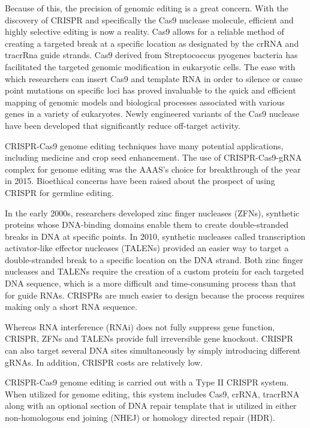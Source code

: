 Because of this, the precision of genomic editing is a great concern. With the discovery of CRISPR and specifically the Cas9 nuclease molecule, efficient and highly selective editing is now a reality. Cas9 allows for a reliable method of creating a targeted break at a specific location as designated by the crRNA and tracrRna guide strands. Cas9 derived from Streptococcus pyogenes bacteria has facilitated the targeted genomic modification in eukaryotic cells. The ease with which researchers can insert Cas9 and template RNA in order to silence or cause point mutations on specific loci has proved invaluable to the quick and efficient mapping of genomic models and biological processes associated with various genes in a variety of eukaryotes. Newly engineered variants of the Cas9 nuclease have been developed that significantly reduce off-target activity.

CRISPR-Cas9 genome editing techniques have many potential applications, including medicine and crop seed enhancement. The use of CRISPR-Cas9-gRNA complex for genome editing was the AAAS's choice for breakthrough of the year in 2015. Bioethical concerns have been raised about the prospect of using CRISPR for germline editing.

In the early 2000s, researchers developed zinc finger nucleases (ZFNs), synthetic proteins whose DNA-binding domains enable them to create double-stranded breaks in DNA at specific points. In 2010, synthetic nucleases called transcription activator-like effector nucleases (TALENs) provided an easier way to target a double-stranded break to a specific location on the DNA strand. Both zinc finger nucleases and TALENs require the creation of a custom protein for each targeted DNA sequence, which is a more difficult and time-consuming process than that for guide RNAs. CRISPRs are much easier to design because the process requires making only a short RNA sequence.

Whereas RNA interference (RNAi) does not fully suppress gene function, CRISPR, ZFNs and TALENs provide full irreversible gene knockout. CRISPR can also target several DNA sites simultaneously by simply introducing different gRNAs. In addition, CRISPR costs are relatively low.

CRISPR-Cas9 genome editing is carried out with a Type II CRISPR system. When utilized for genome editing, this system includes Cas9, crRNA, tracrRNA along with an optional section of DNA repair template that is utilized in either non-homologous end joining (NHEJ) or homology directed repair (HDR).

